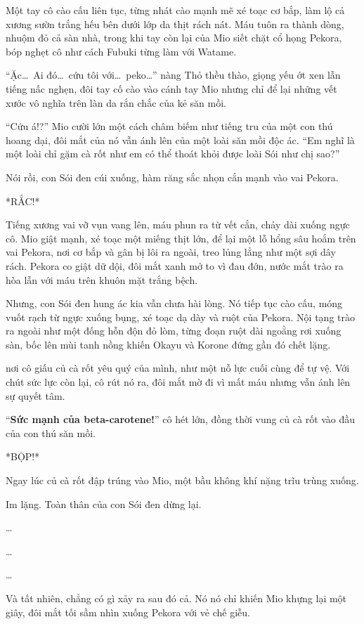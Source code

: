 \documentclass[../main.tex]{subfiles}
\begin{document}
Một tay cô cào cấu liên tục, từng nhát cào mạnh mẽ xé toạc cơ bắp, làm lộ cả xương sườn trắng hếu bên dưới lớp da thịt rách nát. Máu tuôn ra thành dòng, nhuộm đỏ cả sàn nhà, trong khi tay còn lại của Mio siết chặt cổ họng Pekora, bóp nghẹt cô như cách Fubuki từng làm với Watame.

``Ặc\dots\ Ai đó\dots\ cứu tôi với\dots\ peko\dots'' nàng Thỏ thều thào, giọng yếu ớt xen lẫn tiếng nấc nghẹn, đôi tay cố cào vào cánh tay Mio nhưng chỉ để lại những vết xước vô nghĩa trên làn da rắn chắc của kẻ săn mồi.

``Cứu á!?'' Mio cười lớn một cách châm biếm như tiếng tru của một con thú hoang dại, đôi mắt của nó vẫn ánh lên của một loài săn mồi độc ác. ``Em nghĩ là một loài chỉ gặm cà rốt như em có thể thoát khỏi được loài Sói như chị sao?''

Nói rồi, con Sói đen cúi xuống, hàm răng sắc nhọn cắn mạnh vào vai Pekora.

*RẮC!*

Tiếng xương vai vỡ vụn vang lên, máu phun ra từ vết cắn, chảy dài xuống ngực cô. Mio giật mạnh, xé toạc một miếng thịt lớn, để lại một lỗ hổng sâu hoắm trên vai Pekora, nơi cơ bắp và gân bị lôi ra ngoài, treo lủng lẳng như một sợi dây rách. Pekora co giật dữ dội, đôi mắt xanh mở to vì đau đớn, nước mắt trào ra hòa lẫn với máu trên khuôn mặt trắng bệch.

Nhưng, con Sói đen hung ác kia vẫn chưa hài lòng. Nó tiếp tục cào cấu, móng vuốt rạch từ ngực xuống bụng, xé toạc dạ dày và ruột của Pekora. Nội tạng trào ra ngoài như một đống hỗn độn đỏ lòm, từng đoạn ruột dài ngoằng rơi xuống sàn, bốc lên mùi tanh nồng khiến Okayu và Korone đứng gần đó chết lặng.

nơi cô giấu củ cà rốt yêu quý của mình, như một nỗ lực cuối cùng để tự vệ. Với chút sức lực còn lại, cô rút nó ra, đôi mắt mờ đi vì mất máu nhưng vẫn ánh lên sự quyết tâm.

``\textbf{Sức mạnh của beta-carotene!}'' cô hét lớn, đồng thời vung củ cà rốt vào đầu của con thú săn mồi.

*BỘP!*

Ngay lúc củ cà rốt đập trúng vào Mio, một bầu không khí nặng trĩu trùng xuống.

Im lặng. Toàn thân của con Sói đen dừng lại.

\dots

\dots

\dots

Và tất nhiên, chẳng có gì xảy ra sau đó cả. Nó nó chỉ khiến Mio khựng lại một giây, đôi mắt tối sầm nhìn xuống Pekora với vẻ chế giễu.
\end{document}
